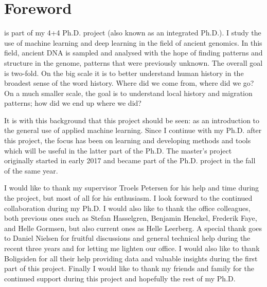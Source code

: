 \chapter*{Foreword}

 is part of my 4+4 Ph.D. project (also known as an integrated Ph.D.). I study the use of machine learning and deep learning in the field of ancient genomics. In this field, ancient DNA is sampled and analysed with the hope of finding patterns and structure in the genome, patterns that were previously unknown. The overall goal is two-fold. On the big scale it is to better understand human history in the broadest sense of the word history. Where did we come from, where did we go? On a much smaller scale, the goal is to understand local history and migration patterns; how did we end up where we did? 

It is with this background that this project should be seen: as an introduction to the general use of applied machine learning. Since I continue with my Ph.D. after this project, the focus has been on learning and developing methods and tools which will be useful in the latter part of the Ph.D. The master's project originally started in early \num{2017} and became part of the Ph.D. project in the fall of the same year. 

I would like to thank my supervisor Troels Petersen for his help and time during the project, but most of all for his enthusiasm. I look forward to the continued collaboration during my Ph.D. I would also like to thank the office colleagues, both previous ones such as Stefan Hasselgren, Benjamin Henckel, Frederik Faye, and Helle Gormsen, but also current ones as Helle Leerberg. A special thank goes to Daniel Nielsen for fruitful discussions and general technical help during the recent three years and for letting me lighten our office. I would also like to thank Boligsiden for all their help providing data and valuable insights during the first part of this project. Finally I would like to thank my friends and family for the continued support during this project and hopefully the rest of my Ph.D. 